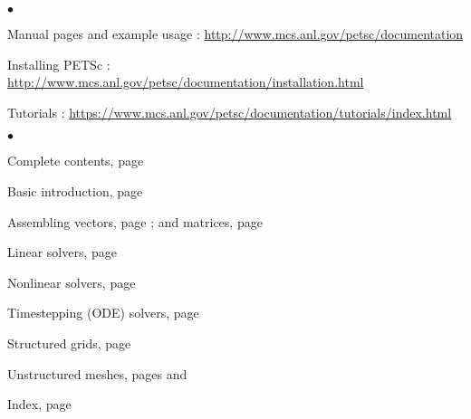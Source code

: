 
%

\medskip\medskip


\medskip


\begin{list}{$\bullet$}
{
\setlength{\itemsep}{-.020in}
\setlength{\topsep}{0in}
\setlength{\partopsep}{0in}
}
\item Manual pages and example usage :
\href{http://www.mcs.anl.gov/petsc/documentation}{http://www.mcs.anl.gov/petsc/documentation}
\item Installing PETSc :
\href{http://www.mcs.anl.gov/petsc/documentation/installation.html}{http://www.mcs.anl.gov/petsc/documentation/installation.html}
\item Tutorials : \href{https://www.mcs.anl.gov/petsc/documentation/tutorials/index.html}{https://www.mcs.anl.gov/petsc/documentation/tutorials/index.html} 
\end{list}

\medskip
{}
\begin{list}{$\bullet$}
{
\setlength{\itemsep}{-.02in}
\setlength{\topsep}{.02in}
\setlength{\partopsep}{0in}
}
\item Complete contents, page \pageref{tableofcontents}
\item Basic introduction, page \pageref{sec_gettingstarted}
\item Assembling vectors, page \pageref{sec_vecbasic}; and matrices, page \pageref{chapter_matrices}
\item Linear solvers, page \pageref{ch_ksp}
\item Nonlinear solvers, page \pageref{chapter_snes}
\item Timestepping (ODE) solvers, page \pageref{chapter_ts}
\item Structured grids, page \pageref{sec_struct} 
\item Unstructured meshes, pages \pageref{sec_unstruct} and \pageref{ch_unstructured}
\item Index, page \pageref{ch_index}
\end{list}

